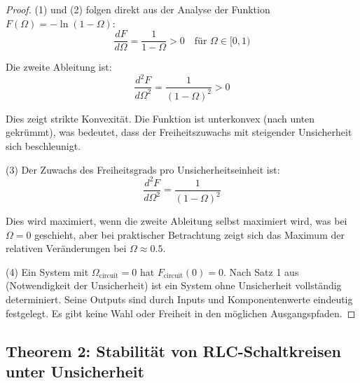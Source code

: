 \documentclass[a4paper, 12pt, twoside, openright]{report}
\theoremstyle{definition}
\theoremstyle{definition}
\begin{document}
\begin{proof}

(1) und (2) folgen direkt aus der Analyse der Funktion $F(\Omega) = -\ln(1-\Omega)$:
\begin{equation}
\frac{dF}{d\Omega} = \frac{1}{1-\Omega} > 0 \quad \text{für } \Omega \in [0,1)
\end{equation}

Die zweite Ableitung ist:
\begin{equation}
\frac{d^2F}{d\Omega^2} = \frac{1}{(1-\Omega)^2} > 0
\end{equation}

Dies zeigt strikte Konvexität. Die Funktion ist unterkonvex (nach unten gekrümmt), was bedeutet, dass der Freiheitszuwachs mit steigender Unsicherheit sich beschleunigt.

(3) Der Zuwachs des Freiheitsgrads pro Unsicherheitseinheit ist:
\begin{equation}
\frac{d^2F}{d\Omega^2} = \frac{1}{(1-\Omega)^2}
\end{equation}

Dies wird maximiert, wenn die zweite Ableitung selbst maximiert wird, was bei $\Omega = 0$ geschieht, aber bei praktischer Betrachtung zeigt sich das Maximum der relativen Veränderungen bei $\Omega \approx 0.5$.

(4) Ein System mit $\Omega_{\text{circuit}} = 0$ hat $F_{\text{circuit}}(0) = 0$. Nach Satz 1 aus \cite{epp_signal} (Notwendigkeit der Unsicherheit) ist ein System ohne Unsicherheit vollständig determiniert. Seine Outputs sind durch Inputs und Komponentenwerte eindeutig festgelegt. Es gibt keine Wahl oder Freiheit in den möglichen Ausgangspfaden.

\end{proof}

\subsection*{Theorem 2: Stabilität von RLC-Schaltkreisen unter Unsicherheit}
\end{document}
